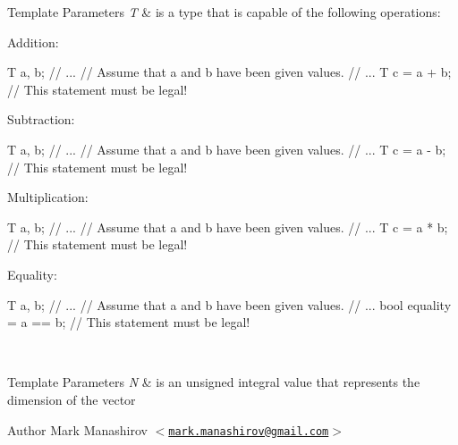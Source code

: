 \label{classmetrobotics_1_1VectorN_operations}%
\hypertarget{classmetrobotics_1_1VectorN_operations}{}%
 
\begin{DoxyTemplParams}{\-Template Parameters}
{\em \-T} & is a type that is capable of the following operations\-: 
\begin{DoxyEnumerate}
\item \-Addition\-: 
\begin{DoxyCode}
                    T a, b;
                    // ...
                    // Assume that a and b have been given values.
                    // ...
                    T c = a + b; // This statement must be legal!
\end{DoxyCode}
  
\item \-Subtraction\-: 
\begin{DoxyCode}
                    T a, b;
                    // ...
                    // Assume that a and b have been given values.
                    // ...
                    T c = a - b; // This statement must be legal!
\end{DoxyCode}
  
\item \-Multiplication\-: 
\begin{DoxyCode}
                    T a, b;
                    // ...
                    // Assume that a and b have been given values.
                    // ...
                    T c = a * b; // This statement must be legal!
\end{DoxyCode}
  
\item \-Equality\-: 
\begin{DoxyCode}
                    T a, b;
                    // ...
                    // Assume that a and b have been given values.
                    // ...
                    bool equality = a == b; // This statement must be legal!
\end{DoxyCode}
  
\end{DoxyEnumerate}\\
\hline
\end{DoxyTemplParams}
\label{classmetrobotics_1_1VectorN_dimension}%
\hypertarget{classmetrobotics_1_1VectorN_dimension}{}%
 
\begin{DoxyTemplParams}{\-Template Parameters}
{\em \-N} & is an unsigned integral value that represents the dimension of the vector\\
\hline
\end{DoxyTemplParams}
\begin{DoxyAuthor}{\-Author}
\-Mark \-Manashirov $<$\href{mailto:mark.manashirov@gmail.com}{\tt mark.\-manashirov@gmail.\-com}$>$ 
\end{DoxyAuthor}


